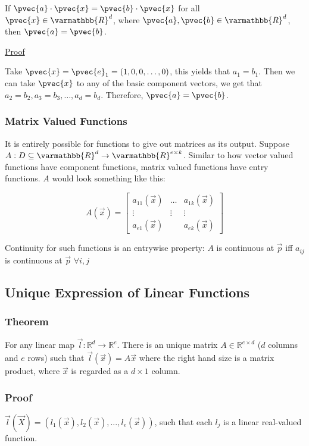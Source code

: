 \documentclass[11 pt, twoside]{article}
\begin{document}
If $\pvec{a} \cdot \pvec{x} = \pvec{b} \cdot \pvec{x}$ for all $\pvec{x} \in
\varmathbb{R}^d$, where $\pvec{a}, \pvec{b} \in \varmathbb{R}^d$, then $\pvec{a} =
\pvec{b}$.

\underline{Proof}

Take $\pvec{x} = \pvec{e}_1 = (1, 0, 0, \dots, 0)$, this yields that $a_1 = b_1$.
Then we can take $\pvec{x}$ to any of the basic component vectors, we get that
$a_2 = b_2, a_3 = b_3, \dots, a_d = b_d$. Therefore, $\pvec{a} = \pvec{b}$.

\subsubsection{Matrix Valued Functions}

It is entirely possible for functions to give out matrices as its output.
Suppose $A : D \subseteq \varmathbb{R}^d \to \varmathbb{R}^{e \times k}$.
Similar to how vector valued functions have component functions, matrix valued
functions have entry functions. $A$ would look something like this:

\[
A(\vec{x}) = \left[\begin{array}{ccc}
a_{11}(\vec{x}) & \dots & a_{1k}(\vec{x})\\
\vdots & \vdots & \vdots \\
a_{e1}(\vec{x}) & & a_{ek}(\vec{x})
\end{array}\right]
\]

Continuity for such functions is an entrywise property: $A$ is continuous at
$\vec{p}$ iff $a_{ij}$ is continuous at $\vec{p}$ $\forall i, j$
\subsection{Unique Expression of Linear Functions}
\subsubsection{Theorem}
For any linear map $\vec{l}: \mathbb{R}^d \to \mathbb{R}^e$.
There is an unique matrix $A \in \mathbb{R}^{e \times d}$ ($d$ columns and
$e$ rows) such that $\vec{l}(\vec{x}) = A\vec{x}$ where the right hand size is a
matrix product, where $\vec{x}$ is regarded as a $d \times 1$ column.

\subsubsection{Proof}
$\vec{l}(\vec{X}) = (l_1(\vec{x}), l_2(\vec{x}),...,l_e(\vec{x}))$, such that each $l_j$ is a linear real-valued function. 
\end{document}
